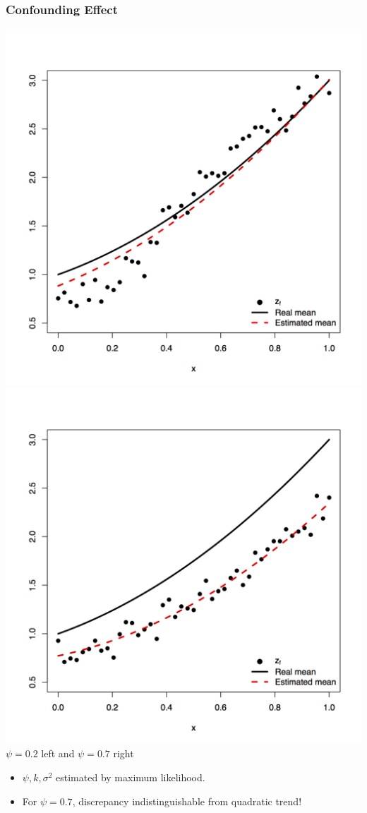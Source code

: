 \documentclass[nopagenumber,9pt]{beamer}
\begin{document}
\begin{frame}
\frametitle{Confounding Effect}



\begin{center}
\includegraphics[width=.4\textwidth]{Confounding_0_2.png}
\includegraphics[width=.4\textwidth]{Confounding_0_7.png}\\
 $\psi=0.2$ left and $\psi=0.7$ right
 \end{center}

  
     
\begin{itemize}
\item $\psi,k,\sigma^2$ estimated by maximum likelihood.
\item For $\psi=0.7$, discrepancy indistinguishable from quadratic trend!
\end{itemize}
  
 
\end{frame}
\end{document}
